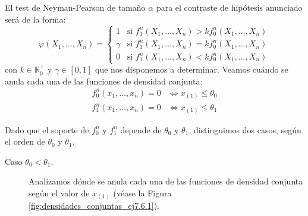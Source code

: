 \begin{ejercicio}
    El test de Neyman-Pearson de tamaño $\alpha$ para el contraste de hipótesis anunciado será de la forma:
    \begin{equation*}
        \varphi(X_1, \ldots, X_n) = \left\{\begin{array}{ll}
            1 & \text{si\ } f_1^n(X_1, \ldots, X_n) > k f_0^n(X_1, \ldots, X_n) \\
            \gamma & \text{si\ } f_1^n(X_1, \ldots, X_n) = k f_0^n(X_1, \ldots, X_n) \\
            0 & \text{si\ } f_1^n(X_1, \ldots, X_n) < k f_0^n(X_1, \ldots, X_n)
        \end{array}\right.
    \end{equation*}
    con $k \in \mathbb{R}^+_0$ y $\gamma \in [0,1]$ que nos disponemos a determinar. Veamos cuándo se anula cada una de las funciones de densidad conjunta:
    \begin{align*}
        f_0^n(x_1, \ldots, x_n) = 0 &\iff x_{(1)} \leq \theta_0 \\
        f_1^n(x_1, \ldots, x_n) = 0 &\iff x_{(1)} \leq \theta_1
    \end{align*}

    Dado que el soporte de $f_0^n$ y $f_1^n$ depende de $\theta_0$ y $\theta_1$, distinguimos dos casos, según el orden de $\theta_0$ y $\theta_1$.
    \begin{description}
        \item[Caso $\theta_0 < \theta_1$.] Analizamos dónde se anula cada una de las funciones de densidad conjunta según el valor de $x_{(1)}$ (véase la Figura \ref{fig:densidades_conjuntas_ej7.6.1}).
        \begin{figure}[h]
            \centering
\end{figure}
\end{description}
\end{ejercicio}
